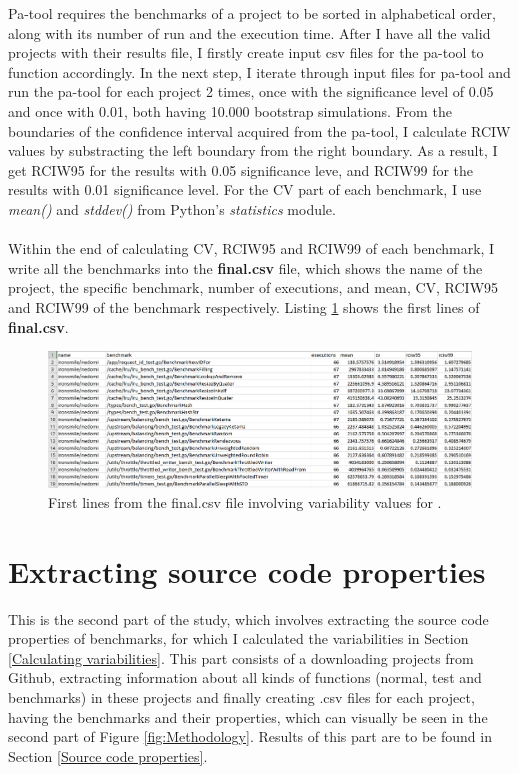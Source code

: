 \documentclass{seal_thesis}
\begin{document}
Pa-tool requires the benchmarks of a project to be sorted in alphabetical order, along with its number of run and the execution time. After I have all the valid projects with their results file, I firstly create input csv files for the pa-tool to function accordingly. In the next step, I iterate through input files for pa-tool and run the pa-tool for each project 2 times, once with the significance level of 0.05 and once with 0.01, both having 10.000 bootstrap simulations. From the boundaries of the confidence interval acquired from the pa-tool, I calculate RCIW values by substracting the left boundary from the right boundary. As a result, I get RCIW95 for the results with 0.05 significance leve, and RCIW99 for the results with 0.01 significance level. For the CV part of each benchmark, I use \textit{mean()} and \textit{stddev()} from Python's \textit{statistics} module\cite{pythonsta}.\\
\\
Within the end of calculating CV, RCIW95 and RCIW99 of each benchmark, I write all the benchmarks into the \textbf{final.csv} file, which shows the name of the project, the specific benchmark, number of executions, and mean, CV, RCIW95 and RCIW99 of the benchmark respectively. Listing \ref{fig:finalcsv} shows the first lines of \textbf{final.csv}.

\begin{figure}[H]
	\centering
	\includegraphics[width=\linewidth]{finalcsvexample}
	\caption{First lines from the final.csv file involving variability values for \cite{ironsmile/nedomi}.}
	\label{fig:finalcsv}
\end{figure}

\section{Extracting source code properties}

This is the second part of the study, which involves extracting the source code properties of benchmarks, for which I calculated the variabilities in Section \ref{Calculating variabilities}. This part consists of a downloading projects from Github, extracting information about all kinds of functions (normal, test and benchmarks) in these projects and finally creating .csv files for each project, having the benchmarks and their properties, which can visually be seen in the second part of Figure \ref{fig:Methodology}. Results of this part are to be found in Section \ref{Source code properties}.
\end{document}
